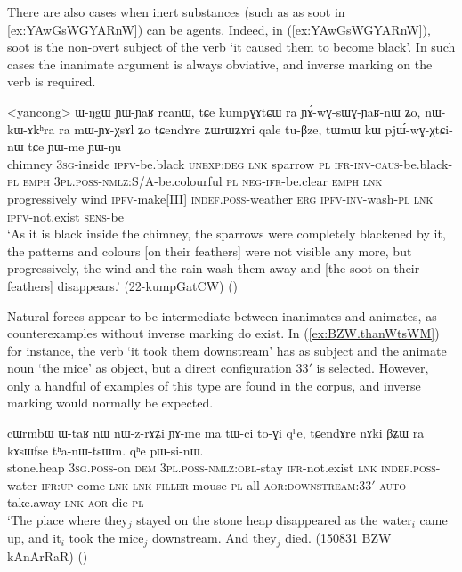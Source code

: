 There are also cases when inert substances (such as as soot in \ref{ex:YAwGsWGYARnW}) can be agents. Indeed, in (\ref{ex:YAwGsWGYARnW}), soot is the non-overt subject of the verb   `it caused them to become black'. In such cases the inanimate argument is always obviative, and inverse marking on the verb is required.

\begin{exe}
\ex \label{ex:YAwGsWGYARnW} 
\gll <yancong> ɯ-ŋgɯ ɲɯ-ɲaʁ rcanɯ, tɕe kumpɣɤtɕɯ ra ɲɤ́-wɣ-sɯɣ-ɲaʁ-nɯ ʑo, nɯ-kɯ-ɤkʰra ra mɯ-ɲɤ-χsɤl ʑo tɕendɤre ʑɯrɯʑɤri qale tu-βze, tɯmɯ kɯ pjɯ́-wɣ-χtɕi-nɯ tɕe ɲɯ-me ɲɯ-ŋu \\
chimney \textsc{3sg}-inside \textsc{ipfv}-be.black \textsc{unexp}:\textsc{deg} \textsc{lnk} sparrow \textsc{pl} \textsc{ifr}-\textsc{inv}-\textsc{caus}-be.black-\textsc{pl} \textsc{emph} \textsc{3pl}.\textsc{poss}-\textsc{nmlz}:S/A-be.colourful \textsc{pl} \textsc{neg}-\textsc{ifr}-be.clear \textsc{emph} \textsc{lnk} progressively wind \textsc{ipfv}-make[III] \textsc{indef}.\textsc{poss}-weather \textsc{erg} \textsc{ipfv}-\textsc{inv}-wash-\textsc{pl} \textsc{lnk} \textsc{ipfv}-not.exist \textsc{sens}-be \\
\glt `As it is black inside the chimney, the sparrows were completely blackened by it, the patterns and colours [on their feathers] were not visible any more, but progressively, the wind and the rain wash them away and [the soot on their feathers] disappears.' (22-kumpGatCW) ()
 
\end{exe}

Natural forces appear to be intermediate between inanimates and animates, as counterexamples without inverse marking do exist. In (\ref{ex:BZW.thanWtsWM}) for instance, the verb  `it took them downstream' has  as subject and the animate noun  `the mice' as object, but a direct configuration 3\fl{}3$'$ is selected. However, only a handful of examples of this type are found in the corpus, and inverse marking would normally be expected.

\begin{exe}
\ex \label{ex:BZW.thanWtsWM}
\gll cɯrmbɯ ɯ-taʁ nɯ nɯ-z-rɤʑi ɲɤ-me ma tɯ-ci to-ɣi qʰe, tɕendɤre nɤki βʑɯ ra kɤsɯfse tʰa-nɯ-tsɯm. qʰe pɯ-si-nɯ. \\
stone.heap \textsc{3sg}.\textsc{poss}-on \textsc{dem} \textsc{3pl}.\textsc{poss}-\textsc{nmlz}:\textsc{obl}-stay \textsc{ifr}-not.exist \textsc{lnk} \textsc{indef}.\textsc{poss}-water \textsc{ifr}:\textsc{up}-come \textsc{lnk} \textsc{lnk} \textsc{filler} mouse \textsc{pl} all \textsc{aor}:\textsc{downstream}:3\fl{}3$'$-\textsc{auto}-take.away \textsc{lnk} \textsc{aor}-die-\textsc{pl} \\
\glt `The place where they$_j$ stayed on the stone heap disappeared as the water$_i$ came up, and it$_i$ took the mice$_j$ downstream. And they$_j$ died.  (150831 BZW kAnArRaR)
()
\end{exe}

